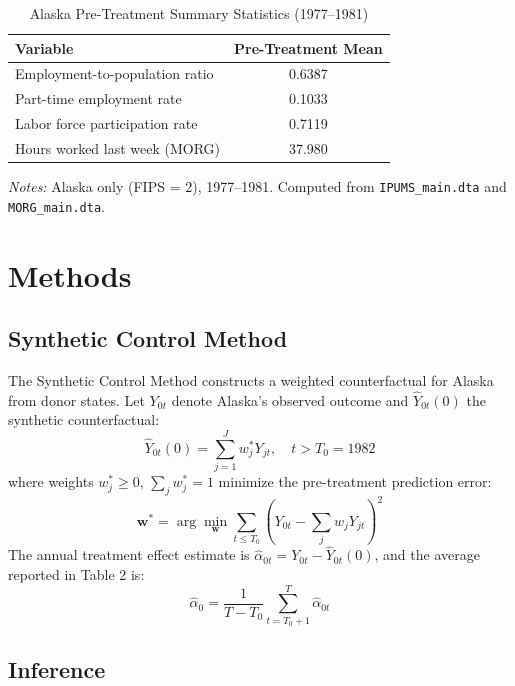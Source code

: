 \documentclass[12pt]{article}
\begin{document}
\begin{table}[h]
\centering
\caption{Alaska Pre-Treatment Summary Statistics (1977--1981)}
\label{tab:descriptives}
\begin{tabular}{lc}
\toprule
Variable & Pre-Treatment Mean \\
\midrule
Employment-to-population ratio & 0.6387 \\
Part-time employment rate      & 0.1033 \\
Labor force participation rate & 0.7119 \\
Hours worked last week (MORG)  & 37.980 \\
\bottomrule
\end{tabular}
\begin{flushleft}
\small \textit{Notes:} Alaska only (FIPS = 2), 1977--1981. Computed from \texttt{IPUMS\_main.dta} and \texttt{MORG\_main.dta}.
\end{flushleft}
\end{table}

\section{Methods}

\subsection{Synthetic Control Method}

The Synthetic Control Method \citep{abadie2010synthetic} constructs a weighted counterfactual for Alaska from donor states. Let $Y_{0t}$ denote Alaska's observed outcome and $\hat{Y}_{0t}(0)$ the synthetic counterfactual:
\begin{equation}
  \hat{Y}_{0t}(0) = \sum_{j=1}^{J} w_j^* Y_{jt}, \quad t > T_0 = 1982
\end{equation}
where weights $w_j^* \geq 0$, $\sum_j w_j^* = 1$ minimize the pre-treatment prediction error:
\begin{equation}
  \mathbf{w}^* = \arg\min_{\mathbf{w}} \sum_{t \leq T_0} \left(Y_{0t} - \sum_j w_j Y_{jt}\right)^2
\end{equation}
The annual treatment effect estimate is $\hat{\alpha}_{0t} = Y_{0t} - \hat{Y}_{0t}(0)$, and the average reported in Table 2 is:
\begin{equation}
  \hat{\alpha}_0 = \frac{1}{T - T_0} \sum_{t=T_0+1}^{T} \hat{\alpha}_{0t}
\end{equation}

\subsection{Inference}
\end{document}
